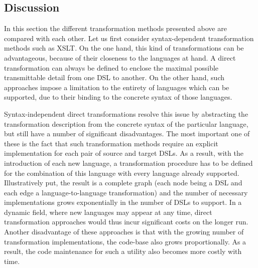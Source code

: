 \subsection{Discussion}

In this section the different transformation methods presented above are compared with each other. Let us first consider syntax-dependent transformation methods such as XSLT. On the one hand, this kind of transformations can be advantageous, because of their closeness to the languages at hand. A direct transformation can always be defined to enclose the maximal possible transmittable detail from one DSL to another. On the other hand, such approaches impose a limitation to the entirety of languages which can be supported, due to their binding to the concrete syntax of those languages.

Syntax-independent direct transformations resolve this issue by abstracting the transformation description from the concrete syntax of the particular language, but still have a number of significant disadvantages. The most important one of these is the fact that such transformation methods require an explicit implementation for each pair of source and target DSLs. As a result, with the introduction of each new language, a transformation procedure has to be defined for the combination of this language with every language already supported. Illustratively put, the result is a complete graph (each node being a DSL and each edge a language-to-language transformation) and the number of necessary implementations grows exponentially in the number of DSLs to support. In a dynamic field, where new languages may appear at any time, direct transformation approaches would thus incur significant costs on the longer run. Another disadvantage of these approaches is that with the growing number of transformation implementations, the code-base also grows proportionally. As a result, the code maintenance for such a utility also becomes more costly with time. 

